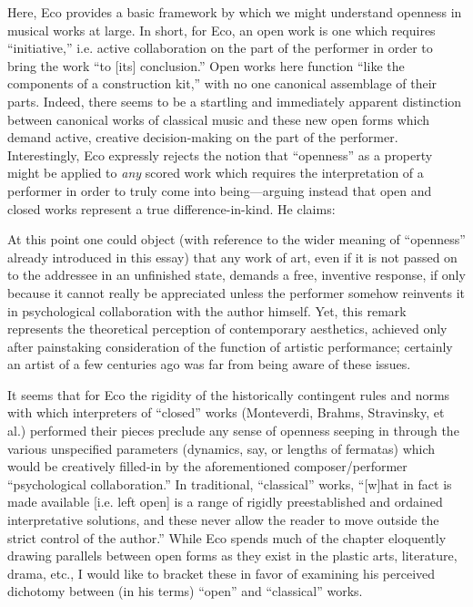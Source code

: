     Here, Eco provides a basic framework by which we might understand openness in musical works at large. In short, for Eco, an open work is one which requires ``initiative,'' i.e. active collaboration on the part of the performer in order to bring the work ``to [its] conclusion.'' Open works here function ``like the components of a construction kit,'' with no one canonical assemblage of their parts. Indeed, there seems to be a startling and immediately apparent distinction between canonical works of classical music and these new open forms which demand active, creative decision-making on the part of the performer. Interestingly, Eco expressly rejects the notion that ``openness'' as a property might be applied to \textit{any} scored work which requires the interpretation of a performer in order to truly come into being---arguing instead that open and closed works represent a true difference-in-kind. He claims:

        \begin{smallquote}
            At this point one could object (with reference to the wider meaning of ``openness'' already introduced in this essay) that any work of art, even if it is not passed on to the addressee in an unfinished state, demands a free, inventive response, if only because it cannot really be appreciated unless the performer somehow reinvents it in psychological collaboration with the author himself. Yet, this remark represents the theoretical perception of contemporary aesthetics, achieved only after painstaking consideration of the function of artistic performance; certainly an artist of a few centuries ago was far from being aware of these issues.\autocite[6]{Eco_Robey_1989}
        \end{smallquote}
    
    It seems that for Eco the rigidity of the historically contingent rules and norms with which interpreters of ``closed'' works (Monteverdi, Brahms, Stravinsky, et al.) performed their pieces preclude any sense of openness seeping in through the various unspecified parameters (dynamics, say, or lengths of fermatas) which would be creatively filled-in by the aforementioned composer/performer ``psychological collaboration.'' In traditional, ``classical'' works, ``[w]hat in fact is made available [i.e. left open] is a range of rigidly preestablished and ordained interpretative solutions, and these never allow the reader to move outside the strict control of the author.''\autocite[6]{Eco_Robey_1989} While Eco spends much of the chapter eloquently drawing parallels between open forms as they exist in the plastic arts, literature, drama, etc., I would like to bracket these in favor of examining his perceived dichotomy between (in his terms) ``open'' and ``classical'' works.
    
